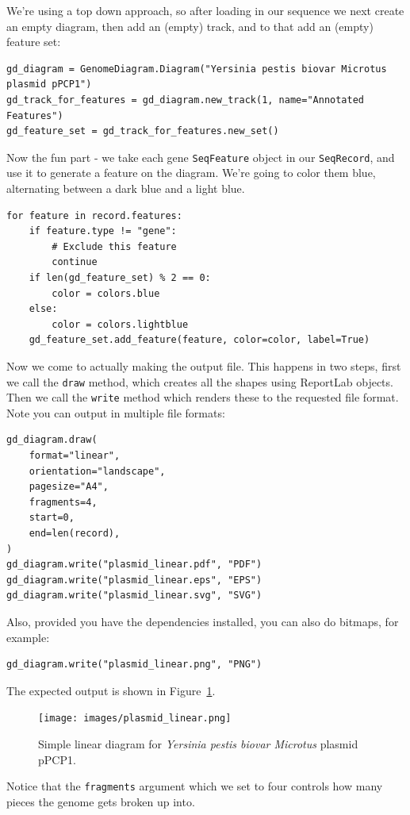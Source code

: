 We're using a top down approach, so after loading in our sequence we next
create an empty diagram, then add an (empty) track, and to that add an
(empty) feature set:

\begin{verbatim}
gd_diagram = GenomeDiagram.Diagram("Yersinia pestis biovar Microtus plasmid pPCP1")
gd_track_for_features = gd_diagram.new_track(1, name="Annotated Features")
gd_feature_set = gd_track_for_features.new_set()
\end{verbatim}

Now the fun part - we take each gene \verb|SeqFeature| object in our
\verb|SeqRecord|, and use it to generate a feature on the diagram. We're
going to color them blue, alternating between a dark blue and a light blue.
\begin{verbatim}
for feature in record.features:
    if feature.type != "gene":
        # Exclude this feature
        continue
    if len(gd_feature_set) % 2 == 0:
        color = colors.blue
    else:
        color = colors.lightblue
    gd_feature_set.add_feature(feature, color=color, label=True)
\end{verbatim}

Now we come to actually making the output file.  This happens in two steps,
first we call the \verb|draw| method, which creates all the shapes using
ReportLab objects.  Then we call the \verb|write| method which renders these
to the requested file format.  Note you can output in multiple file formats:

\begin{verbatim}
gd_diagram.draw(
    format="linear",
    orientation="landscape",
    pagesize="A4",
    fragments=4,
    start=0,
    end=len(record),
)
gd_diagram.write("plasmid_linear.pdf", "PDF")
gd_diagram.write("plasmid_linear.eps", "EPS")
gd_diagram.write("plasmid_linear.svg", "SVG")
\end{verbatim}

Also, provided you have the dependencies installed, you can also do bitmaps,
for example:

\begin{verbatim}
gd_diagram.write("plasmid_linear.png", "PNG")
\end{verbatim}

\begin{htmlonly}

\end{htmlonly}
\begin{latexonly}
The expected output is shown in Figure~\ref{fig:plasmid_linear}.
\begin{figure}[htbp]
\centering
\texttt{[image: images/plasmid\_linear.png]}
\caption{Simple linear diagram for \textit{Yersinia pestis biovar Microtus} plasmid pPCP1.}
\label{fig:plasmid_linear}
\end{figure}
\end{latexonly}
Notice that the \verb|fragments| argument which we set to four controls how
many pieces the genome gets broken up into.


